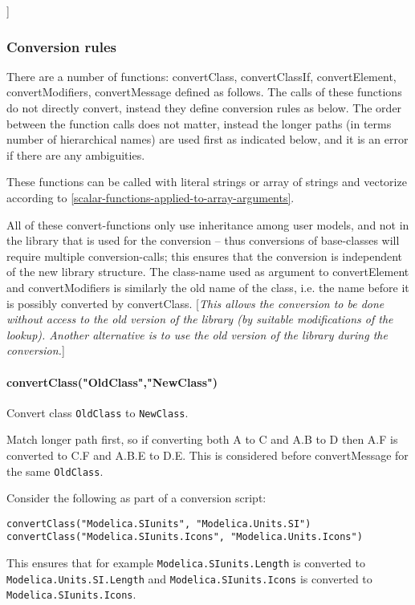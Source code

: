 {]}

\subsubsection{Conversion rules}

There are a number of functions: convertClass, convertClassIf,
convertElement, convertModifiers, convertMessage defined as follows. The
calls of these functions do not directly convert, instead they define
conversion rules as below. The order between the function calls does not
matter, instead the longer paths (in terms number of hierarchical names)
are used first as indicated below, and it is an error if there are any
ambiguities.

These functions can be called with literal strings or array of strings
and vectorize according to \autoref{scalar-functions-applied-to-array-arguments}.

All of these convert-functions only use inheritance among user
models, and not in the library that is used for the conversion -- thus
conversions of base-classes will require multiple conversion-calls; this
ensures that the conversion is independent of the new library structure.
The class-name used as argument to convertElement and convertModifiers
is similarly the old name of the class, i.e. the name before it is
possibly converted by convertClass. {[}\emph{This allows the conversion
to be done without access to the old version of the library (by suitable
modifications of the lookup). Another alternative is to use the old
version of the library during the conversion.}{]}

\paragraph*{convertClass("OldClass","NewClass")}

Convert class \lstinline!OldClass! to \lstinline!NewClass!.

Match longer path first, so if converting both A to C and A.B to D then
A.F is converted to C.F and A.B.E to D.E. This is considered before
convertMessage for the same \lstinline!OldClass!.

\begin{example}
Consider the following as part of a conversion script:
\begin{lstlisting}[language=modelica]
convertClass("Modelica.SIunits", "Modelica.Units.SI")
convertClass("Modelica.SIunits.Icons", "Modelica.Units.Icons")
\end{lstlisting}
This ensures that for example \lstinline!Modelica.SIunits.Length! is converted to \lstinline!Modelica.Units.SI.Length!
and \lstinline!Modelica.SIunits.Icons! is converted to \lstinline!Modelica.SIunits.Icons!.
\end{example}
